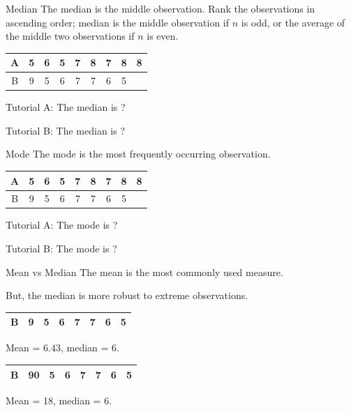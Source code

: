 \documentclass[12pt]{beamer}
\begin{document}
\begin{frame}{Median}
	The median is the middle observation. Rank the observations in ascending order; median is the middle observation if $n$ is odd, or the average of the middle two observations if $n$ is even.
	\vspace{0.5cm}
	
	\begin{center}
		\begin{tabular}{|c|c|c|c|c|c|c|c|c|}
			\hline
			A & 5 & 6 & 5 & 7 & 8 & 7 & 8 & 8\\
			\hline
			B & 9 & 5 & 6 & 7 & 7 & 6 & 5 & \\
			\hline
		\end{tabular}
	\end{center}
	\vspace{0.5cm}
	
	Tutorial A: The median is ?
	
	Tutorial B: The median is ?
\end{frame}
\begin{frame}{Mode}
	The mode is the most frequently occurring observation.
	\vspace{0.5cm}
	
	\begin{center}
		\begin{tabular}{|c|c|c|c|c|c|c|c|c|}
			\hline
			A & 5 & 6 & 5 & 7 & 8 & 7 & 8 & 8\\
			\hline
			B & 9 & 5 & 6 & 7 & 7 & 6 & 5 & \\
			\hline
		\end{tabular}
	\end{center}
	\vspace{0.5cm}
	
	Tutorial A: The mode is ?
	
	Tutorial B: The mode is ?
\end{frame}
\begin{frame}{Mean vs Median}
	The mean is the most commonly used measure.
	
	\vspace{0.5cm}
	
	But, the median is more robust to extreme observations.
	
	\begin{center}
		\begin{tabular}{|c|c|c|c|c|c|c|c|}
			\hline
			B & 9 & 5 & 6 & 7 & 7 & 6 & 5\\
			\hline
		\end{tabular}
	\end{center}
	
	Mean = 6.43, median = 6.
	\vspace{0.5cm}
	
	\begin{center}
	\begin{tabular}{|c|c|c|c|c|c|c|c|}
		\hline
		B &90 & 5 & 6 & 7 & 7 & 6 & 5\\
		\hline
	\end{tabular}
	\end{center}
	
	Mean = 18, median = 6.
\end{frame}
\end{document}
